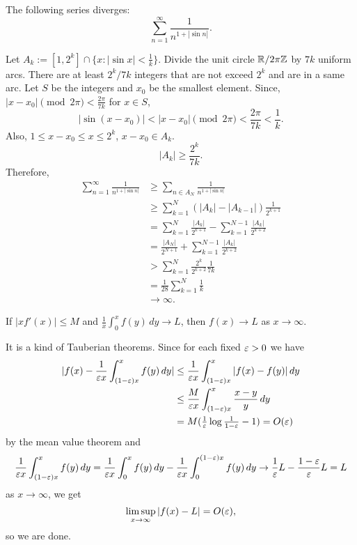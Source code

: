 \documentclass[a4paper]{article}
\begin{document}
\begin{prb}
The following series diverges: \[\sum_{n=1}^\infty\frac1{n^{1+|\sin n|}}.\]
\end{prb}
\begin{sol}
Let $A_k:=[1,2^k]\cap\{x:|\sin x|<\frac1k\}$.
Divide the unit circle $\mathbb{R}/2\pi\mathbb{Z}$ by $7k$ uniform arcs.
There are at least $2^k/7k$ integers that are not exceed $2^k$ and are in a same arc.
Let $S$ be the integers and $x_0$ be the smallest element.
Since, $|x-x_0|\pmod{2\pi}<\frac{2\pi}{7k}$ for $x\in S$,
\[|\sin(x-x_0)|<|x-x_0|\pmod{2\pi}<\frac{2\pi}{7k}<\frac1k.\]
Also, $1\le x-x_0\le x\le2^k$, $x-x_0\in A_k$.
\[|A_k|\ge\frac{2^k}{7k}.\]
Therefore,
\begin{align*}
\sum_{n=1}^\infty\frac1{n^{1+|\sin n|}}
&\ge\sum_{n\in A_N}\frac1{n^{1+|\sin n|}}\\
&\ge\sum_{k=1}^N(|A_k|-|A_{k-1}|)\frac1{2^{k+1}}\\
&=\sum_{k=1}^N\frac{|A_k|}{2^{k+1}}-\sum_{k=1}^{N-1}\frac{|A_k|}{2^{k+2}}\\
&=\frac{|A_N|}{2^{N+1}}+\sum_{k=1}^{N-1}\frac{|A_k|}{2^{k+2}}\\
&>\sum_{k=1}^N\frac{2^k}{2^{k+2}}\frac1{7k}\\
&=\frac1{28}\sum_{k=1}^N\frac1k\\
&\to\infty.
\end{align*}
\end{sol}

\clearpage
\begin{prb}
If $|xf'(x)|\le M$ and $\frac1x\int_0^xf(y)\,dy\to L$, then $f(x)\to L$ as $x\to\infty$.
\end{prb}
\begin{sol}
It is a kind of Tauberian theorems.
Since for each fixed $\varepsilon>0$ we have
\begin{align*}
|f(x)-\frac1{\varepsilon x}\int_{(1-\varepsilon)x}^xf(y)\,dy|
&\le\frac1{\varepsilon x}\int_{(1-\varepsilon)x}^x|f(x)-f(y)|\,dy\\
&\le\frac M{\varepsilon x}\int_{(1-\varepsilon)x}^x\frac{x-y}y\,dy\\
&=M(\tfrac1{\varepsilon}\log\tfrac1{1-\varepsilon}-1)=O(\varepsilon)
\end{align*}
by the mean value theorem and 
\[\frac1{\varepsilon x}\int_{(1-\varepsilon)x}^xf(y)\,dy
=\frac1{\varepsilon x}\int_0^xf(y)\,dy-\frac1{\varepsilon x}\int_0^{(1-\varepsilon)x}f(y)\,dy\to\frac1{\varepsilon} L-\frac{1-\varepsilon}{\varepsilon} L=L\]
as $x\to\infty$, we get
\[\limsup_{x\to\infty}|f(x)-L|=O(\varepsilon),\]
so we are done.
\end{sol}
\end{document}
